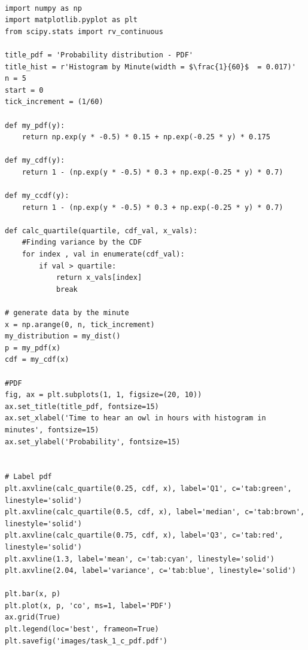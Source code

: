 \begin{lstlisting}[caption={Plotting the PDF and histogram)},label={lst:code_task_1_c}]

import numpy as np
import matplotlib.pyplot as plt
from scipy.stats import rv_continuous

title_pdf = 'Probability distribution - PDF'
title_hist = r'Histogram by Minute(width = $\frac{1}{60}$  = 0.017)'
n = 5
start = 0
tick_increment = (1/60)

def my_pdf(y):
    return np.exp(y * -0.5) * 0.15 + np.exp(-0.25 * y) * 0.175

def my_cdf(y):
    return 1 - (np.exp(y * -0.5) * 0.3 + np.exp(-0.25 * y) * 0.7)

def my_ccdf(y):
    return 1 - (np.exp(y * -0.5) * 0.3 + np.exp(-0.25 * y) * 0.7)

def calc_quartile(quartile, cdf_val, x_vals):
    #Finding variance by the CDF 
    for index , val in enumerate(cdf_val):
        if val > quartile:
            return x_vals[index]
            break

# generate data by the minute
x = np.arange(0, n, tick_increment)
my_distribution = my_dist()
p = my_pdf(x)
cdf = my_cdf(x)

#PDF
fig, ax = plt.subplots(1, 1, figsize=(20, 10))
ax.set_title(title_pdf, fontsize=15)
ax.set_xlabel('Time to hear an owl in hours with histogram in minutes', fontsize=15)
ax.set_ylabel('Probability', fontsize=15)


# Label pdf
plt.axvline(calc_quartile(0.25, cdf, x), label='Q1', c='tab:green', linestyle='solid')
plt.axvline(calc_quartile(0.5, cdf, x), label='median', c='tab:brown', linestyle='solid')
plt.axvline(calc_quartile(0.75, cdf, x), label='Q3', c='tab:red', linestyle='solid')
plt.axvline(1.3, label='mean', c='tab:cyan', linestyle='solid')
plt.axvline(2.04, label='variance', c='tab:blue', linestyle='solid')

plt.bar(x, p)
plt.plot(x, p, 'co', ms=1, label='PDF')
ax.grid(True)
plt.legend(loc='best', frameon=True)
plt.savefig('images/task_1_c_pdf.pdf')
\end{lstlisting}


